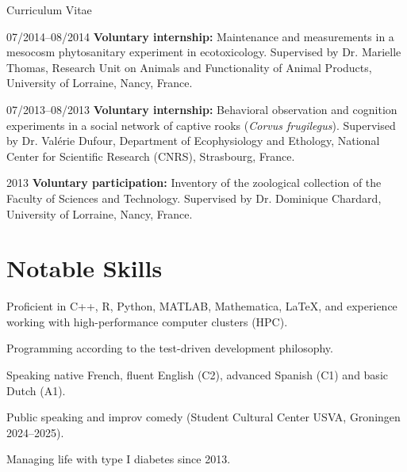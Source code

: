 \documentclass[11pt,a4paper]{article}
\begin{document}
\begin{cv}{Curriculum Vitae}
\begin{cvlist}{}
			\item[07/2014--08/2014] \textbf{Voluntary internship:} Maintenance and measurements in a mesocosm phytosanitary experiment in ecotoxicology. Supervised by Dr. Marielle Thomas, Research Unit on Animals and Functionality of Animal Products, University of Lorraine, Nancy, France.
		
			\item[07/2013--08/2013] \textbf{Voluntary internship:} Behavioral observation and cognition experiments in a social network of captive rooks (\textit{Corvus frugilegus}). Supervised by Dr. Valérie Dufour, Department of Ecophysiology and Ethology, National Center for Scientific Research (CNRS), Strasbourg, France. 
		
			\item[2013] \textbf{Voluntary participation:} Inventory of the zoological collection of the Faculty of Sciences and Technology. Supervised by Dr. Dominique Chardard, University of Lorraine, Nancy, France.
		
		\end{cvlist}
		
		\section{Notable Skills}
		
		\begin{cvlist}{}
			
			\item Proficient in C++, R, Python, MATLAB, Mathematica, LaTeX, and experience working with high-performance computer clusters (HPC).
            
			\item Programming according to the test-driven development philosophy.
            
			\item Speaking native French, fluent English (C2), advanced Spanish (C1) and basic Dutch (A1).

            \item Public speaking and improv comedy (Student Cultural Center USVA, Groningen 2024--2025).
            
			\item Managing life with type I diabetes since 2013.
			
		\end{cvlist}
			
		
		\vfill
		\date{}
		
	\end{cv}
	
\end{document}
